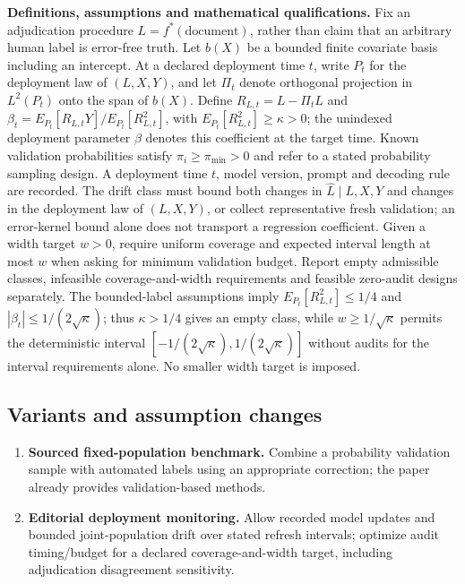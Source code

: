 \documentclass[11pt,a4paper]{article}
\begin{document}
\textbf{Definitions, assumptions and mathematical qualifications.} Fix an adjudication procedure \(L=f^*(\text{document})\), rather than claim that an arbitrary human label is error-free truth. Let \(b(X)\) be a bounded finite covariate basis including an intercept. At a declared deployment time \(t\), write \(P_t\) for the deployment law of \((L,X,Y)\), and let \(\Pi_t\) denote orthogonal projection in \(L^2(P_t)\) onto the span of \(b(X)\). Define \(R_{L,t}=L-\Pi_tL\) and \(\beta_t=E_{P_t}[R_{L,t}Y]/E_{P_t}[R_{L,t}^2]\), with \(E_{P_t}[R_{L,t}^2]\geq\kappa>0\); the unindexed deployment parameter \(\beta\) denotes this coefficient at the target time. Known validation probabilities satisfy \(\pi_i\geq\pi_{\min}>0\) and refer to a stated probability sampling design. A deployment time \(t\), model version, prompt and decoding rule are recorded. The drift class must bound both changes in \(\widehat L\mid L,X,Y\) and changes in the deployment law of \((L,X,Y)\), or collect representative fresh validation; an error-kernel bound alone does not transport a regression coefficient. Given a width target \(w>0\), require uniform coverage and expected interval length at most \(w\) when asking for minimum validation budget. Report empty admissible classes, infeasible coverage-and-width requirements and feasible zero-audit designs separately. The bounded-label assumptions imply \(E_{P_t}[R_{L,t}^2]\leq1/4\) and \(|\beta_t|\leq1/(2\sqrt\kappa)\); thus \(\kappa>1/4\) gives an empty class, while \(w\geq1/\sqrt\kappa\) permits the deterministic interval \([-1/(2\sqrt\kappa),1/(2\sqrt\kappa)]\) without audits for the interval requirements alone. No smaller width target is imposed.
\subsection*{Variants and assumption changes}
\begin{enumerate}
\item \textbf{Sourced fixed-population benchmark.} Combine a probability validation sample with automated labels using an appropriate correction; the paper already provides validation-based methods.
\item \textbf{Editorial deployment monitoring.} Allow recorded model updates and bounded joint-population drift over stated refresh intervals; optimize audit timing/budget for a declared coverage-and-width target, including adjudication disagreement sensitivity.
\end{enumerate}
\end{document}
